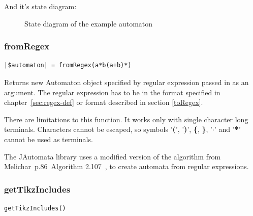 \documentclass{ctuthesis}
\begin{document}
And it's state diagram:
\begin{figure}[H]
\caption{State diagram of the example automaton}
\label{fig:example_automaton_diagram}
\end{figure}

\subsubsection{fromRegex}
\label{fromRegex}
\begin{lstlisting}[language = JASL_snippet]
	|$automaton| = fromRegex(a*b(a+b)*)
\end{lstlisting}

Returns new Automaton object specified by regular expression passed in as an argument. The regular expression has to be in the format specified in chapter~\ref{sec:regex-def} or format described in section \ref{toRegex}.

There are limitations to this function. It works only with single character long terminals. Characters cannot be escaped, so symbols '\textbf{(}', '\textbf{)}', \textbf{\{}, \textbf{\}}, '$\mathbf{\cdot}$' and '\textbf{*}' cannot be used as terminals. 

The JAutomata library uses a modified version of the algorithm from Melichar~p.86~Algorithm 2.107~\cite{melichar}, to create automata from regular expressions.

\subsubsection{getTikzIncludes}
\label{subsec:getTikzIncludes}
\begin{lstlisting}[language = JASL_snippet]
	getTikzIncludes()
\end{lstlisting}
\end{document}
